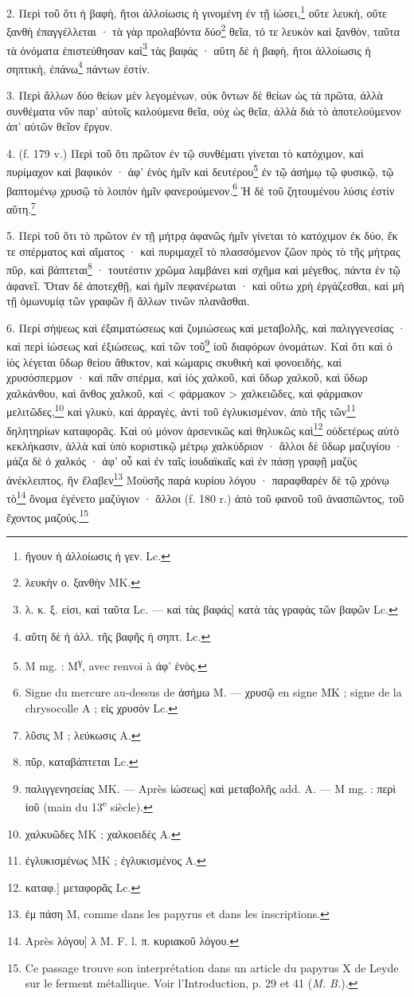 \documentclass[landscape, a4paper, 11pt, oneside, polutonikogreek, french]{article}
\begin{document}
2. Περὶ τοῦ ὅτι ἡ βαφὴ, ἤτοι ἀλλοίωσις ἡ γινομένη ἐν τῇ ἰώσει,\footnote{ἤγουν ἡ ἀλλοίωσις ἡ γεν. Lc.} οὔτε λευκὴ, οὔτε ξανθὴ ἐπαγγέλλεται · τὰ γὰρ προλαβόντα δύο\footnote{λευκὴν ο. ξανθὴν MK.} θεῖα, τό τε λευκὸν καὶ ξανθὸν, ταῦτα τὰ ὀνόματα ἐπιστεύθησαν καὶ\footnote{λ. κ. ξ. εἰσι, καὶ ταῦτα Lc. --- καὶ τὰς βαφάς] κατὰ τὰς γραφὰς τῶν βαφῶν Lc.} τὰς βαφάς · αὕτη δὲ ἡ βαφὴ, ἤτοι ἀλλοίωσις ἡ σηπτικὴ, ἐπάνω\footnote{αὕτη δὲ ἡ ἀλλ. τῆς βαφῆς ἡ σηπτ. Lc.} πάντων ἐστίν.

3. Περὶ ἄλλων δύο θείων μὲν λεγομένων, οὐκ ὄντων δὲ θείων ὡς τὰ πρῶτα, ἀλλὰ συνθέματα νῦν παρ' αὐτοῖς καλούμενα θεῖα, οὐχ ὡς θεῖα, ἀλλὰ διὰ τὸ ἀποτελούμενον ἀπ' αὐτῶν θεῖον ἔργον.

4. (f. 179 v.) Περὶ τοῦ ὅτι πρῶτον ἐν τῷ συνθέματι γίνεται τὸ κατόχιμον, καὶ πυρίμαχον καὶ βαφικόν · ἀφ' ἑνὸς ἡμῖν καὶ δευτέρου\footnote{M mg. : M\textsuperscript{γ}, avec renvoi à άφ' ἑνὸς.} ἐν τῷ ἀσήμῳ τῷ φυσικῷ, τῷ βαπτομένῳ χρυσῷ τὸ λοιπὸν ἡμῖν φανερούμενον.\footnote{Signe du mercure au-dessus de ἀσήμω M. --- χρυσῷ en signe MΚ ; signe de la chrysocolle A ; εἰς χρυσὸν Lc.} Ἡ δὲ τοῦ ζητουμένου λύσις ἐστὶν αὕτη.\footnote{λῦσις M ; λεύκωσις A.}

5. Περὶ τοῦ ὅτι τὸ πρῶτον ἐν τῇ μήτρᾳ ἀφανῶς ἡμῖν γίνεται τὸ κατόχιμον ἐκ δύο, ἔκ τε σπέρματος καὶ αἵματος · καὶ πυριμαχεῖ τὸ πλασσόμενον ζῶον πρὸς τὸ τῆς μήτρας πῦρ, καὶ βάπτεται\footnote{πῦρ, καταβάπτεται Lc.} · τουτέστιν χρῶμα λαμβάνει καὶ σχῆμα καὶ μέγεθος, πάντα ἐν τῷ ἀφανεῖ. Ὅταν δὲ ἀποτεχθῇ, καὶ ἡμῖν πεφανέρωται · καὶ οὕτω χρὴ ἐργάζεσθαι, καὶ μὴ τῇ ὁμωνυμίᾳ τῶν γραφῶν ἢ ἄλλων τινῶν πλανᾶσθαι.

6. Περί σήψεως καὶ ἐξαιματώσεως καὶ ζυμιώσεως καὶ μεταβολῆς, καὶ παλιγγενεσίας · καὶ περὶ ἰώσεως καὶ ἐξιώσεως, καὶ τῶν τοῦ\footnote{παλιγγενησείας MK. --- Après ἰώσεως] καὶ μεταβολῆς add. A. --- M mg. : περὶ ἰοῦ (main du 13\textsuperscript{e} siècle).} ἰοῦ διαφόρων ὀνομάτων. Καὶ ὅτι καὶ ὁ ἰὸς λέγεται ὕδωρ θείου ἄθικτον, καὶ κώμαρις σκυθικὴ καὶ φονοειδὴς, καὶ χρυσόσπερμον · καὶ πᾶν σπέρμα, καὶ ἰὸς χαλκοῦ, καὶ ὕδωρ χαλκοῦ, καὶ ὕδωρ χαλκάνθου, καὶ ἄνθος χαλκοῦ, καὶ < φάρμακον > χαλκειῶδες, καὶ φάρμακον μελιτῶδες,\footnote{χαλκυῶδες MK ; χαλκοειδὲς A.} καὶ γλυκὺ, καὶ ἀρραγὲς, ἀντὶ τοῦ ἐγλυκισμένον, ἀπὸ τῆς τῶν\footnote{ἐγλυκισμένως MK ; ἐγλυκισμένος A.} δηλητηρίων καταφορᾶς. Καὶ οὐ μόνον ἀρσενικῶς καὶ θηλυκῶς καὶ\footnote{καταφ.] μεταφορᾶς Lc.} οὐδετέρως αὐτὸ κεκλήκασιν, ἀλλὰ καὶ ὑπὸ κοριστικῷ μέτρῳ χαλκύδριον · ἄλλοι δὲ ὕδωρ μαζυγίου · μάζα δὲ ὁ χαλκός · ἀφ' οὗ καὶ ἐν ταῖς ἰουδαϊκαῖς καὶ ἐν πάσῃ γραφῇ μαζὺς ἀνέκλειπτος, ἣν ἔλαβεν\footnote{ἐμ πάση M, comme dans les papyrus et dans les inscriptions.} Μοϋσῆς παρὰ κυρίου λόγου · παραφθαρὲν δὲ τῷ χρόνῳ τὸ\footnote{Après λόγου] λ M. F. l. π. κυριακοῦ λόγου.} ὄνομα ἑγένετο μαζύγιον · ἄλλοι (f. 180 r.) ἀπὸ τοῦ φανοῦ τοῦ ἀνασπῶντος, τοῦ ἔχοντος μαζούς.\footnote{Ce passage trouve son interprétation dans un article du papyrus X de Leyde sur le ferment métallique. Voir l'Introduction, p. 29 et 41 (\emph{M. B.}).}
\end{document}
